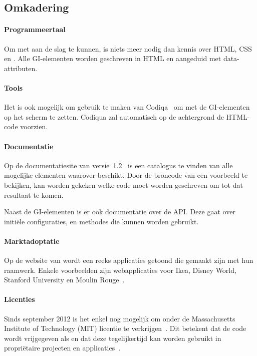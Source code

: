 \subsection{Omkadering}
\paragraph{Programmeertaal}
Om met \jqm{} aan de slag te kunnen, is niets meer nodig dan kennis over HTML, CSS en \js{}. 
Alle GI-elementen worden geschreven in HTML en aangeduid met data-attributen.

\paragraph{Tools}
Het is ook mogelijk om gebruik te maken van Codiqa~\cite{Sperry2012} om met  de GI-elementen op het scherm te zetten. 
Codiqua zal automatisch op de achtergrond de HTML-code voorzien.

\paragraph{Documentatie}
Op de documentatiesite van versie~1.2~\cite{JQuery2012b} is een catalogus te vinden van alle mogelijke elementen waarover \jqm{} beschikt. 
Door de broncode van een voorbeeld te bekijken, kan worden gekeken welke code moet worden geschreven om tot dat resultaat te komen.

Naast de GI-elementen is er ook documentatie over de API. 
Deze gaat over initiële configuraties,  en methodes die kunnen worden gebruikt.

\paragraph{Marktadoptatie}
Op de website van \jqm{} wordt een reeks applicaties getoond die gemaakt zijn met hun raamwerk. 
Enkele voorbeelden zijn webapplicaties voor Ikea, Disney World, Stanford University en Moulin Rouge~\cite{JQuery2012a}. 

\paragraph{Licenties}
Sinds september 2012 is het enkel nog mogelijk om \jqm{} onder de Massachusetts Institute of Technology (MIT) licentie te verkrijgen~\cite{Dmethvin2012}. 
Dit betekent dat de code wordt vrijgegeven als  en dat deze tegelijkertijd kan worden gebruikt in propriëtaire projecten en applicaties~\cite{PhilDutson2012}.

